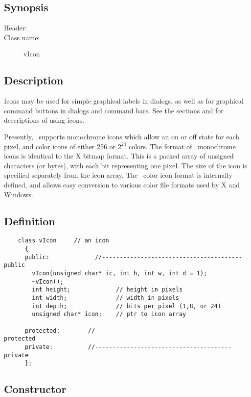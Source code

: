 \subsection* {Synopsis}

\begin{description}
        \item [Header:] 
	\item [Class name:] vIcon
\end{description}

\subsection* {Description}

Icons may be used for simple graphical labels in dialogs,
as well as for graphical command buttons in dialogs and command bars.
See the sections  and  for
descriptions of using icons.

Presently, \V\ supports monochrome icons which allow an on or
off state for each pixel, and color icons of either 256 or $2^{24}$ colors.
The format of \V\ monochrome icons is identical to the X bitmap format. This
is a packed array of unsigned characters (or bytes), with each bit
representing one pixel. The size of the icon is specified
separately from the icon array. The \V\ color icon format is internally
defined, and allows easy conversion to various color file formats
used by X and Windows.

\subsection* {Definition}

\footnotesize
\begin{verbatim}
    class vIcon     // an icon
      {
      public:             //---------------------------------------- public
        vIcon(unsigned char* ic, int h, int w, int d = 1);
        ~vIcon();
        int height;             // height in pixels
        int width;              // width in pixels
        int depth;              // bits per pixel (1,8, or 24)
        unsigned char* icon;    // ptr to icon array

      protected:        //--------------------------------------- protected
      private:          //--------------------------------------- private
      };
\end{verbatim}
\normalfont\normalsize

\subsection* {Constructor} %

